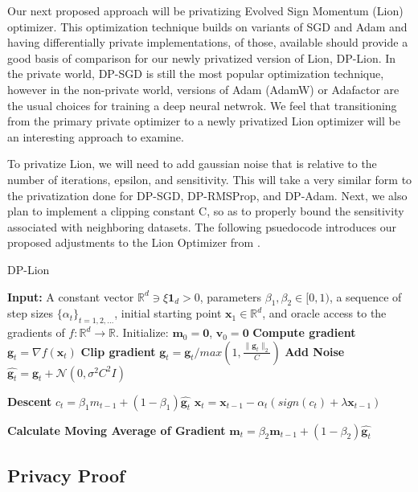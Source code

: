 Our next proposed approach will be privatizing Evolved Sign Momentum (Lion) optimizer. This optimization technique builds on variants of SGD and Adam and having 
differentially private implementations, of those, available should provide a good basis of comparison for our newly privatized version of Lion, DP-Lion. In the private world,
DP-SGD is still the most popular optimization technique, however in the non-private world, versions of Adam (AdamW) or Adafactor are the usual choices for training
a deep neural netwrok. \cite{chen2023symbolicdiscoveryoptimizationalgorithms} We feel that transitioning from the primary private optimizer to a newly privatized Lion optimizer
will be an interesting approach to examine.

To privatize Lion, we will need to add gaussian noise that is relative to the number of iterations, epsilon, and sensitivity. This will take a very similar form to the privatization
done for DP-SGD, DP-RMSProp, and DP-Adam. Next, we also plan to implement a clipping constant C, so as to properly bound the sensitivity associated with neighboring datasets. The following psuedocode
introduces our proposed adjustments to the Lion Optimizer from \cite{chen2023symbolicdiscoveryoptimizationalgorithms}.

\begin{algorithm}
    \caption{DP-Lion}
    \label{alg:lion}
    \begin{algorithmic}[1]
        \State \textbf{Input:} A constant vector $\mathbb{R}^d \ni \xi \mathbf{1}_d > 0$, parameters $\beta_1, \beta_2 \in [0, 1)$, a sequence of step sizes $\{\alpha_t\}_{t=1,2,\dots}$, initial starting point $\mathbf{x}_1 \in \mathbb{R}^d$, and oracle access to the gradients of $f : \mathbb{R}^d \to \mathbb{R}$.
            \State Initialize: $\mathbf{m}_0 = \mathbf{0}$, $\mathbf{v}_0 = \mathbf{0}$
            \State \textbf{Compute gradient}
                \State $\mathbf{g}_t = \nabla f(\mathbf{x}_t)$
                \State \textbf{Clip gradient}
                \State $\mathbf{g}_t = \mathbf{g}_t/max(1, \frac{\lVert \mathbf{g}_t \rVert_{2} }{C})$
                \State \textbf{Add Noise}
                \State $\hat{\mathbf{g}_t} = \mathbf{g}_t + \mathcal{N}(0,\sigma^{2}C^{2}I)$

                \State \textbf{Descent}
                \State $c_{t} = \beta_1 m_{t-1} + (1 - \beta_1) \hat{\mathbf{g}_t}$
                \State $\mathbf{x}_{t} = \mathbf{x}_{t-1} - \alpha_{t} (sign(c_{t}) + \lambda \mathbf{x}_{t-1})$

                \State \textbf{Calculate Moving Average of Gradient}
                \State $\mathbf{m}_t = \beta_2 \mathbf{m}_{t-1} + (1 - \beta_2) \hat{\mathbf{g}_t}$

            \EndFor
        \EndFunction
    \end{algorithmic}
\end{algorithm}

\subsection{Privacy Proof}\label{subsec:incremental-improvements}
